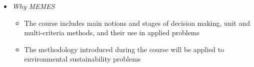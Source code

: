 \documentclass[trans]{beamer}
\newenvironment{stepitemize}{\begin{itemize}[<+->]}{\end{itemize} }
\begin{document}
\begin{frame}%



%

\begin{stepitemize}
\item \textit{Why MEMES}

\begin{stepitemize}
\item The course includes main notions and stages of decision making, unit
and multi-criteria methods, and their use in applied problems

\item The methodology introduced during the course will be applied to
environmental sustainability problems
\end{stepitemize}
\end{stepitemize}

\transboxout%
\end{frame}%
\end{document}

